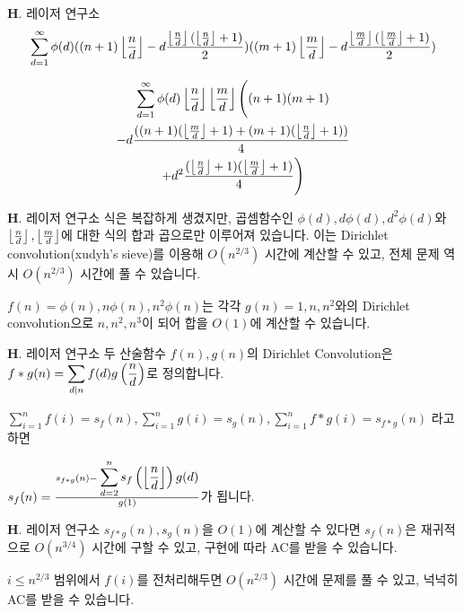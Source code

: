 \begin{frame}{\textbf{H}. 레이저 연구소}
    $$\displaystyle \sum_{d=1}^{\infty} \phi(d)((n+1)\left\lfloor{n \over d}\right\rfloor-d{\left\lfloor{n \over d}\right\rfloor(\left\lfloor{n \over d}\right\rfloor+1) \over 2})((m+1)\left\lfloor{m \over d}\right\rfloor-d{\left\lfloor{m \over d}\right\rfloor(\left\lfloor{m \over d}\right\rfloor+1) \over 2})$$

    \vspace{18pt}
    
    \begin{multline}
    \displaystyle \sum_{d=1}^{\infty} \phi(d)\left\lfloor{n \over d}\right\rfloor\left\lfloor{m \over d}\right\rfloor \Bigg( (n+1)(m+1) \\
    -d{( (n+1)(\left\lfloor{m \over d}\right\rfloor+1) + (m+1)(\left\lfloor{n \over d}\right\rfloor+1) ) \over 4} \\
    +d^{2}{(\left\lfloor{n \over d}\right\rfloor+1)(\left\lfloor{m \over d}\right\rfloor+1) \over 4} \Bigg) 
    \end{multline}

\end{frame}
    
\begin{frame}{\textbf{H}. 레이저 연구소}
    식은 복잡하게 생겼지만, 곱셈함수인 $\phi(d), d\phi(d), d^{2}\phi(d)$와 $\left\lfloor{n \over d}\right\rfloor, \left\lfloor{m \over d}\right\rfloor$에 대한 식의 합과 곱으로만 이루어져 있습니다. 이는 Dirichlet convolution(xudyh's sieve)를 이용해 $O(n^{2/3})$ 시간에 계산할 수 있고, 전체 문제 역시 $O(n^{2/3})$ 시간에 풀 수 있습니다.
    
    \vspace{18pt}
    
    $f(n) = \phi(n), n\phi(n), n^{2}\phi(n)$는 각각 $g(n) = 1, n, n^2$와의 Dirichlet convolution으로 $n, n^2, n^3$이 되어 합을 $O(1)$에 계산할 수 있습니다.

\end{frame}    

\begin{frame}{\textbf{H}. 레이저 연구소}
    두 산술함수 $f(n), g(n)$의 Dirichlet Convolution은 $f\ast g(n) = \displaystyle \sum_{d \vert n} f(d)g\left({n\over d}\right)$로 정의합니다.
    
    \vspace{18pt}
    
    $\displaystyle \sum_{i=1}^{n} f(i) = s_{f}(n), \displaystyle \sum_{i=1}^{n} g(i) = s_{g}(n), \displaystyle \sum_{i=1}^{n} f\ast g(i) = s_{f\ast g}(n)$ 라고 하면

    \vspace{18pt}
    
    $s_{f}(n) = {{s_{f\ast g}(n)-\displaystyle \sum_{d=2}^{n} s_{f}\left(\left\lfloor{n \over d}\right\rfloor\right)g(d)} \over {g(1)}}$가 됩니다.
\end{frame}

\begin{frame}{\textbf{H}. 레이저 연구소}
    $s_{f\ast g}(n), s_{g}(n)$을 $O(1)$에 계산할 수 있다면 $s_{f}(n)$은 재귀적으로 $O(n^{3/4})$ 시간에 구할 수 있고, 구현에 따라 AC를 받을 수 있습니다.
    
    $i \leq n^{2/3}$ 범위에서 $f(i)$를 전처리해두면 $O(n^{2/3})$ 시간에 문제를 풀 수 있고, 넉넉히 AC를 받을 수 있습니다.
\end{frame}
